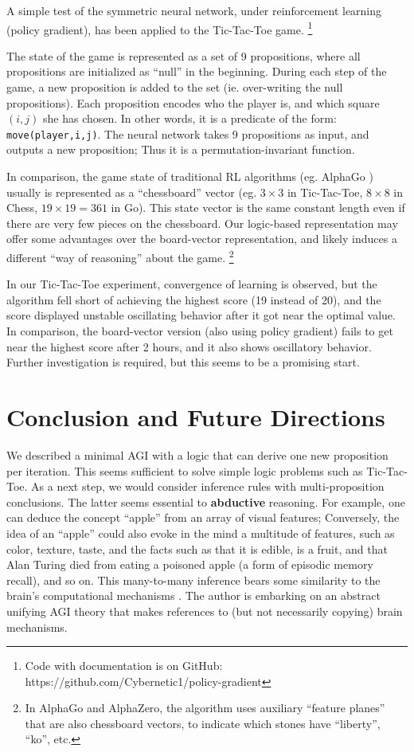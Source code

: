\documentclass[orivec]{llncs}
\begin{document}
A simple test of the symmetric neural network, under reinforcement learning (policy gradient), has been applied to the Tic-Tac-Toe game. \footnote{ Code with documentation is on GitHub: https://github.com/Cybernetic1/policy-gradient }

The state of the game is represented as a set of 9 propositions, where all propositions are initialized as ``null'' in the beginning.  During each step of the game, a new proposition is added to the set (ie. over-writing the null propositions).  Each proposition encodes who the player is, and which square $(i,j)$ she has chosen.  In other words, it is a predicate of the form: \texttt{move(player,i,j)}.  The neural network takes 9 propositions as input, and outputs a new proposition;  Thus it is a permutation-invariant function.

In comparison, the game state of traditional RL algorithms (eg. AlphaGo \cite{Silver2016} \cite{Silver2017} \cite{Pumperla2019}) usually is represented as a ``chessboard'' vector (eg. $3 \times 3$ in Tic-Tac-Toe, $8 \times 8$ in Chess, $19 \times 19 = 361$ in Go).  This state vector is the same constant length even if there are very few pieces on the chessboard.  Our logic-based representation may offer some advantages over the board-vector representation, and likely induces a different ``way of reasoning'' about the game. \footnote{In AlphaGo and AlphaZero, the algorithm uses auxiliary ``feature planes'' that are also chessboard vectors, to indicate which stones have ``liberty'', ``ko'', etc.}

In our Tic-Tac-Toe experiment, convergence of learning is observed, but the algorithm fell short of achieving the highest score (19 instead of 20), and the score displayed unstable oscillating behavior after it got near the optimal value.  In comparison, the board-vector version (also using policy gradient) fails to get near the highest score after 2 hours, and it also shows oscillatory behavior.  Further investigation is required, but this seems to be a promising start.

\section{Conclusion and Future Directions}

We described a minimal AGI with a logic that can derive one new proposition per iteration.  This seems sufficient to solve simple logic problems such as Tic-Tac-Toe.  As a next step, we would consider inference rules with multi-proposition conclusions.  The latter seems essential to \textbf{abductive} reasoning.  For example, one can deduce the concept ``apple'' from an array of visual features;  Conversely, the idea of an ``apple'' could also evoke in the mind a multitude of features, such as color, texture, taste, and the facts such as that it is edible, is a fruit, and that Alan Turing died from eating a poisoned apple (a form of episodic memory recall), and so on.  This many-to-many inference bears some similarity to the brain's computational mechanisms \cite{Rolls2016} \cite{Rolls2021} \cite{Boraud2020}.  The author is embarking on an abstract unifying AGI theory that makes references to (but not necessarily copying) brain mechanisms.
\end{document}
